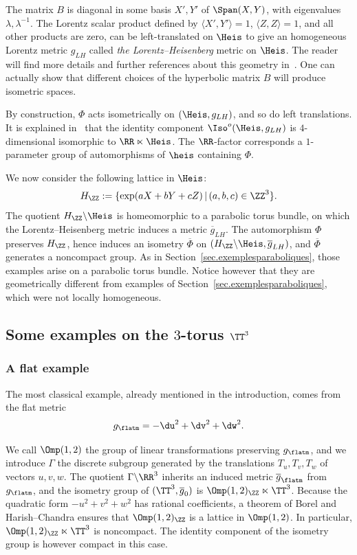 The matrix $B$ is diagonal in some basis $X',Y'$ of $\Span(X,Y)$, with eigenvalues $\lambda,\lambda^{-1}$. The Lorentz scalar product defined by $\langle X',Y'\rangle=1$, $\langle Z,Z\rangle=1$, and all other products are zero, can be left-translated on $\Heis$ to give an homogeneous Lorentz metric $g_{LH}$ called \emph{the Lorentz--Heisenberg} metric on $\Heis$. The reader will find more details and further references about this geometry in~\cite[Section~4.1]{sorin.ghani}. One can actually show that different choices of the hyperbolic matrix $B$ will produce isometric spaces.

By construction, $\Phi$ acts isometrically on $(\Heis,g_{LH})$, and so do left translations. It is explained in~\cite[Section~4.1]{sorin.ghani} that the identity component $\Iso^o(\Heis, g_{LH})$ is $4$-dimensional isomorphic to $\RR \ltimes \Heis$. The $\RR$-factor corresponds a $1$-parameter group of automorphisms of $\heis$ containing $\Phi$.

We now consider the following lattice in $\Heis$:
\[
H_{\ZZ}:=\{ \exp(aX+bY+cZ) \, | \, (a,b,c) \in \ZZ^3 \}.
\]
The quotient $H_{\ZZ} \backslash \Heis$ is homeomorphic to a parabolic torus bundle, on which the Lorentz--Heisenberg metric induces a metric $\overline{g}_{LH}$. The automorphism $\Phi$ preserves $H_{\ZZ}$, hence induces an isometry $\overline{\Phi}$ on $(H_{\ZZ} \backslash \Heis,\overline{g}_{LH})$, and $\overline{\Phi}$ generates a noncompact group. As in Section~\ref{sec.exemplesparaboliques}, those examples arise on a parabolic torus bundle. Notice however that they are geometrically different from examples of Section~\ref{sec.exemplesparaboliques}, which were not locally homogeneous.

\subsection{Some examples on the \texorpdfstring{$3$}{3}-torus \texorpdfstring{$\TT^3$}{TT3}}\label{sec.exemplestorus}



\subsubsection{A flat example}\label{sec.exemplestorus1}
The most classical example, already mentioned in the introduction, comes from the flat metric
\[
g_{\flatm}=-\du^2+\dv^2+\dw^2.
\]

We call $\Omp(1,2)$ the group of linear transformations preserving $g_{\flatm}$, and we introduce $\Gamma$ the discrete subgroup generated by the translations $T_u,T_v,T_w$ of vectors $u,v,w$. The quotient $\Gamma \backslash \RR^3$ inherits an induced metric $\overline{g}_{\flatm}$ from $g_{\flatm}$, and the isometry group of $(\TT^3,\overline{g}_0)$ is $\Omp(1,2)_{\ZZ} \ltimes \TT^3$. Because the quadratic form $-u^2+v^2+w^2$ has rational coefficients, a theorem of Borel and Harish--Chandra ensures that $\Omp(1,2)_{\ZZ}$ is a lattice in $\Omp(1,2)$. In particular, $\Omp(1,2)_{\ZZ} \ltimes \TT^3$ is noncompact. The identity component of the isometry group is however compact in this case.

